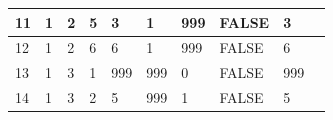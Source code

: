\begin{table}[h!]
\begin{tabular}{|l|l|l|l|l|l|l|l|l|l|}
		11                                                          & 1                                                       & 2                                                       & 5                                                       & 3                                                                        & 1                                                                        & 999                                                                      & FALSE                                                           & 3                                                                        &                                                               \\ \hline
		12                                                          & 1                                                       & 2                                                       & 6                                                       & 6                                                                        & 1                                                                        & 999                                                                      & FALSE                                                           & 6                                                                        &                                                               \\ \hline
		13                                                          & 1                                                       & 3                                                       & 1                                                       & 999                                                                      & 999                                                                      & 0                                                                        & FALSE                                                           & 999                                                                      &                                                               \\ \hline
		14                                                          & 1                                                       & 3                                                       & 2                                                       & 5                                                                        & 999                                                                      & 1                                                                        & FALSE                                                           & 5                                                                        &                                                               \\ \hline

\end{tabular}
\end{table}
